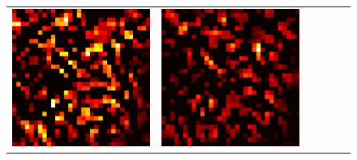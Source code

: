 \documentclass[preprint,12pt]{elsarticle}
\begin{document}
\begin{figure}[p]
\begin{tabular}{cccccc}
  \includegraphics[scale=\scale]{../visualizations/examples/cifar10/resnet18/active_saliency_map/5.png} & 
  \includegraphics[scale=\scale]{../visualizations/examples/cifar10/resnet18/inactive_saliency_map/5.png} \\
  

\end{tabular}
\end{figure}
\end{document}
